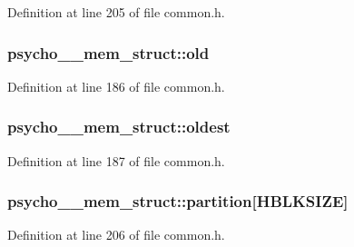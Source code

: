 Definition at line 205 of file common.\+h.

\subsubsection[{\texorpdfstring{old}{old}}]{ psycho\+\_\+\_\+mem\+\_\+struct\+::old}\hypertarget{structpsycho__4__mem__struct_aa418be00038817732da782b827154044}{}\label{structpsycho__4__mem__struct_aa418be00038817732da782b827154044}


Definition at line 186 of file common.\+h.

\subsubsection[{\texorpdfstring{oldest}{oldest}}]{ psycho\+\_\+\_\+mem\+\_\+struct\+::oldest}\hypertarget{structpsycho__4__mem__struct_a555b66decbf67bb6c62d4002c6cd9e54}{}\label{structpsycho__4__mem__struct_a555b66decbf67bb6c62d4002c6cd9e54}


Definition at line 187 of file common.\+h.

\subsubsection[{\texorpdfstring{partition}{partition}}]{ psycho\+\_\+\_\+mem\+\_\+struct\+::partition\mbox{[}{\bf H\+B\+L\+K\+S\+I\+ZE}\mbox{]}}\hypertarget{structpsycho__4__mem__struct_afb676fffd61570099fbefc1c21cec027}{}\label{structpsycho__4__mem__struct_afb676fffd61570099fbefc1c21cec027}


Definition at line 206 of file common.\+h.

